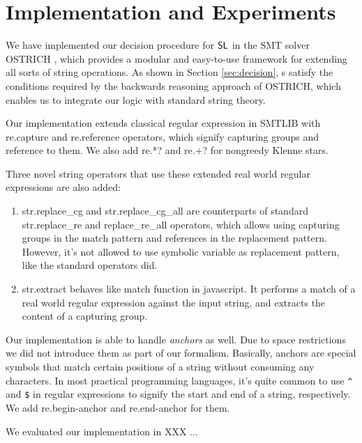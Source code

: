 \section{Implementation and Experiments}
\label{sect:impl}

We have implemented our decision procedure for $\mathsf{SL}$ in the SMT solver OSTRICH \cite{CHL+19}, which provides a modular and easy-to-use framework for extending all sorts of string operations. As shown in Section \ref{sec:decision}, \PSST s satisfy the conditions required by the backwards reasoning approach of OSTRICH, which enables us to integrate our logic with standard string theory.

Our implementation extends classical regular expression in SMTLIB with {\sf re.capture} and {\sf re.reference} operators, which signify capturing groups and reference to them. We also add {\sf re.*?} and {\sf re.+?} for nongreedy Klenne stars.

Three novel string operators that use these extended real world regular expressions are also added:

\begin{enumerate}
  \item {\sf str.replace\_cg} and {\sf str.replace\_cg\_all} are
  counterparts of standard {\sf str.replace\_re} and
  {\sf replace\_re\_all} operators, which allows using
  capturing groups in the match pattern and references
  in the replacement pattern. However, it's not allowed to use symbolic
  variable as replacement pattern, like the standard operators did.
  
  \item {\sf str.extract} behaves like {\sf match} function in
  javascript. It performs a match of a real world regular expression against
  the input string, and extracts the content of a capturing group.
\end{enumerate}

Our implementation is able to handle \textit{anchors} as well. Due to space restrictions we did not introduce them as part of our formalism. Basically, anchors are special symbols that match certain positions of a string without consuming any characters. In most practical programming languages, it's quite common to use \verb!^! and \verb!$! in regular expressions to signify the start and end of a string, respectively. We add \textsf{re.begin-anchor} and \textsf{re.end-anchor} for them.

We evaluated our implementation in XXX ...

